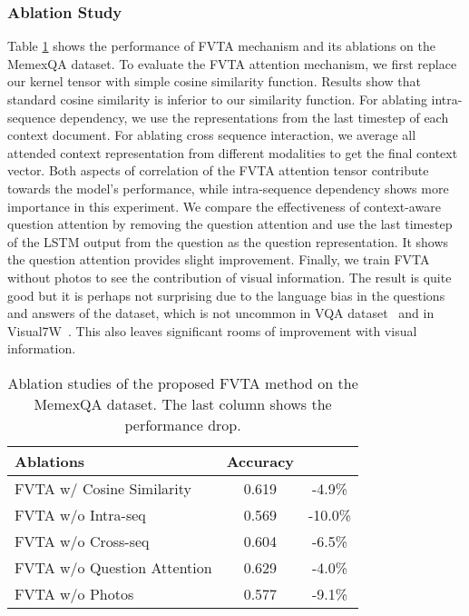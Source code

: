 \subsubsection{Ablation Study}
Table \ref{exp-mem-abla} shows the performance of FVTA mechanism and its ablations on the MemexQA dataset. 
To evaluate the FVTA attention mechanism, we first replace our kernel tensor with simple cosine similarity function. Results show that standard cosine similarity is inferior to our similarity function. 
For ablating intra-sequence dependency, we use the representations from the last timestep of each context document. For ablating cross sequence interaction, we average all attended context representation from different modalities to get the final context vector.
Both aspects of correlation of the FVTA attention tensor contribute towards the model's performance, while intra-sequence dependency shows more importance in this experiment. We compare the effectiveness of context-aware question attention by removing the question attention and use the last timestep of the LSTM output from the question as the question representation. It shows the question attention provides slight improvement. Finally, we train FVTA without photos to see the contribution of visual information. The result is quite good but it is perhaps not surprising due to the language bias in the questions and answers of the dataset, which is not uncommon in VQA dataset~\cite{antol2015vqa} and in Visual7W~\cite{zhu2016visual7w}. This also leaves significant rooms of improvement with visual information.

\begin{table}[ht]
\centering
\begin{tabular}{l||c|c}
\hline
Ablations      & Accuracy &  \\ \hline \hline
FVTA w/ Cosine Similarity  & 0.619 & -4.9\% \\
FVTA w/o Intra-seq  &0.569& -10.0\% \\
FVTA w/o Cross-seq  & 0.604& -6.5\%\\
FVTA w/o Question Attention 		&0.629 &-4.0\%\\ 
FVTA w/o Photos &	0.577& -9.1\%\\
\hline
\end{tabular}
\vspace{1mm}
\caption{Ablation studies of the proposed FVTA method on the MemexQA dataset. 
The last column shows the performance drop.}
\label{exp-mem-abla}
\end{table}




